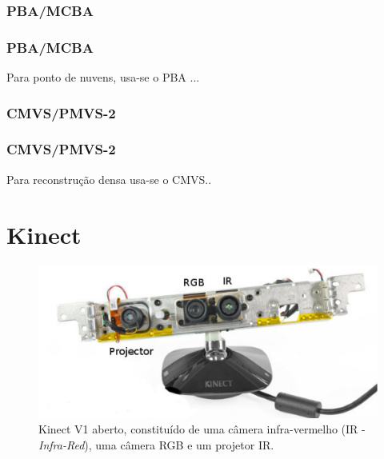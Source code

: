 \documentclass[table, usenames, svgnames, xcolor=dvipsnames]{beamer}
\begin{document}
\subsubsection{PBA/MCBA}

\begin{frame} 
\frametitle{\textbf{PBA/MCBA}}
	\begin{center}
Para ponto de nuvens, usa-se o PBA ...
	\end{center}
\end{frame}

\subsubsection{CMVS/PMVS-2}

\begin{frame} 
\frametitle{\textbf{CMVS/PMVS-2}}
	\begin{center}
Para reconstrução densa usa-se o CMVS..
	\end{center}
\end{frame}

\section{Kinect}

\begin{frame}
	\begin{itemize}
		\item {Baseado em luz estruturada}
		\item {Baseado em \emph{Time of Flight}
	\end{itemize}
\end{frame}

\begin{figure}[!h]
	\centering
	\includegraphics[width=0.5\linewidth]{figs/kinect.png}
	\caption{%
 		 Kinect V1 aberto, constituído de uma câmera infra-vermelho (IR -
 		 \emph{Infra-Red}), uma câmera RGB e um projetor IR.
	}
\end{figure}
\end{document}
